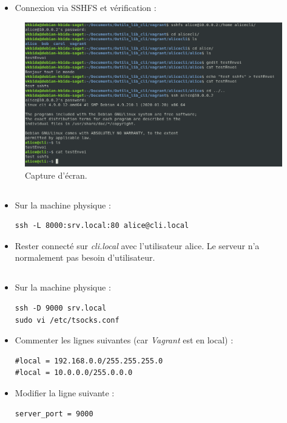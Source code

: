 \documentclass{article}
\begin{document}
\begin{itemize}
    \item Connexion via SSHFS et vérification :
\end{itemize}

\begin{figure}[h]
\centering
\includegraphics[width=\textwidth]{images/q2-3-2.jpg}
\caption{\label{fig:frog}Capture d'écran.}
\end{figure}

\FloatBarrier

\subsection{}

\begin{itemize}
\item Sur la machine physique :
\begin{lstlisting}
ssh -L 8000:srv.local:80 alice@cli.local
\end{lstlisting}
\item Rester connecté sur \emph{cli.local} avec l’utilisateur alice. Le serveur n’a normalement pas besoin d’utilisateur.
\end{itemize}

\subsection{}

\begin{itemize}
\item Sur la machine physique :
\begin{lstlisting}
ssh -D 9000 srv.local
sudo vi /etc/tsocks.conf
\end{lstlisting}
\item Commenter les lignes suivantes (car \emph{Vagrant} est en local) :
\begin{lstlisting}
#local = 192.168.0.0/255.255.255.0
#local = 10.0.0.0/255.0.0.0
\end{lstlisting}
\item Modifier la ligne suivante :
\begin{lstlisting}
server_port = 9000
\end{lstlisting}
\end{itemize}
\end{document}
